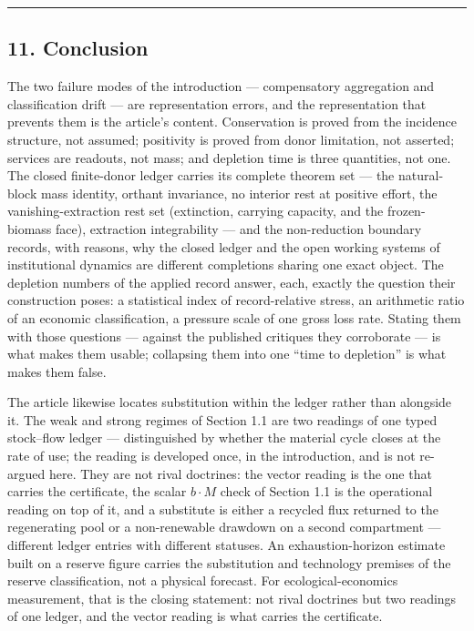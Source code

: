 \documentclass[11pt]{article}
\begin{document}
\begin{center}\rule{0.5\linewidth}{0.5pt}\end{center}

\subsection{11. Conclusion}\label{conclusion}

The two failure modes of the introduction --- compensatory aggregation
and classification drift --- are representation errors, and the
representation that prevents them is the article's content. Conservation
is proved from the incidence structure, not assumed; positivity is
proved from donor limitation, not asserted; services are readouts, not
mass; and depletion time is three quantities, not one. The closed
finite-donor ledger carries its complete theorem set --- the
natural-block mass identity, orthant invariance, no interior rest at
positive effort, the vanishing-extraction rest set (extinction, carrying
capacity, and the frozen-biomass face), extraction integrability --- and
the non-reduction boundary records, with reasons, why the closed ledger
and the open working systems of institutional dynamics are different
completions sharing one exact object. The depletion numbers of the
applied record answer, each, exactly the question their construction
poses: a statistical index of record-relative stress, an arithmetic
ratio of an economic classification, a pressure scale of one gross loss
rate. Stating them with those questions --- against the published
critiques they corroborate --- is what makes them usable; collapsing
them into one ``time to depletion'' is what makes them false.

The article likewise locates substitution within the ledger rather than
alongside it. The weak and strong regimes of Section 1.1 are two
readings of one typed stock--flow ledger --- distinguished by whether
the material cycle closes at the rate of use; the reading is developed
once, in the introduction, and is not re-argued here. They are not rival
doctrines: the vector reading is the one that carries the certificate,
the scalar \(b\cdot M\) check of Section 1.1 is the operational reading
on top of it, and a substitute is either a recycled flux returned to the
regenerating pool or a non-renewable drawdown on a second compartment
--- different ledger entries with different statuses. An
exhaustion-horizon estimate built on a reserve figure carries the
substitution and technology premises of the reserve classification, not
a physical forecast. For ecological-economics measurement, that is the
closing statement: not rival doctrines but two readings of one ledger,
and the vector reading is what carries the certificate.
\end{document}
